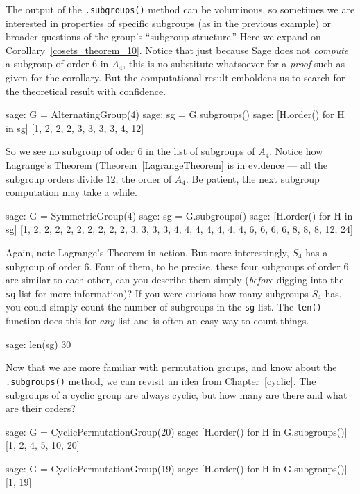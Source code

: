 %
The output of the \verb?.subgroups()? method can be voluminous, so sometimes we are interested in properties of specific subgroups (as in the previous example) or broader questions of the group's ``subgroup structure.''  Here we expand on Corollary~\ref{cosets_theorem_10}.  Notice that just because Sage does not \emph{compute} a subgroup of order 6 in $A_4$, this is no substitute whatsoever for a \emph{proof} such as given for the corollary.  But the computational result emboldens us to search for the theoretical result with confidence.
%
\begin{sageexample}
sage: G = AlternatingGroup(4)
sage: sg = G.subgroups()
sage: [H.order() for H in sg]
[1, 2, 2, 2, 3, 3, 3, 3, 4, 12]
\end{sageexample}
%
So we see no subgroup of oder 6 in the list of subgroups of $A_4$.  Notice how Lagrange's Theorem (Theorem~\ref{LagrangeTheorem} is in evidence --- all the subgroup orders divide $12$, the order of $A_4$.  Be patient, the next subgroup computation may take a while.
%
\begin{sageexample}
sage: G = SymmetricGroup(4)
sage: sg = G.subgroups()
sage: [H.order() for H in sg]
[1, 2, 2, 2, 2, 2, 2, 2, 2, 2, 3, 3, 3, 3, 4, 4, 4, 4, 4, 4, 4,
 6, 6, 6, 6, 8, 8, 8, 12, 24]
\end{sageexample}
%
Again, note Lagrange's Theorem in action.  But more interestingly, $S_4$ has a subgroup of order 6.  Four of them, to be precise.  these four subgroups of order 6 are similar to each other, can you describe them simply (\emph{before} digging into the \verb?sg? list for more information)?  If you were curious how many subgroups $S_4$ has, you could simply count the number of subgroups in the \verb?sg? list.  The \verb?len()? function does this for \emph{any} list and is often an easy way to count things.
%
\begin{sageexample}
sage: len(sg)
30
\end{sageexample}
%
%
Now that we are more familiar with permutation groups, and know about the \verb?.subgroups()? method, we can revisit an idea from Chapter~\ref{cyclic}.  The subgroups of a cyclic group are always cyclic, but how many are there and what are their orders?
%
\begin{sageexample}
sage: G = CyclicPermutationGroup(20)
sage: [H.order() for H in G.subgroups()]
[1, 2, 4, 5, 10, 20]
\end{sageexample}
%
\begin{sageexample}
sage: G = CyclicPermutationGroup(19)
sage: [H.order() for H in G.subgroups()]
[1, 19]
\end{sageexample}
